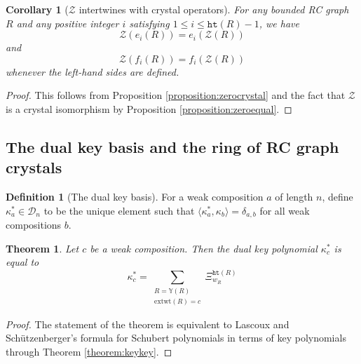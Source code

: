 \documentclass[a4paper,fleqn]{cas-sc}
\newtheorem{corollary}[lemma]{Corollary}
\newtheorem{theorem}{Theorem}[section]
\theoremstyle{definition}
\newtheorem{definition}[lemma]{Definition}
\theoremstyle{remark}
\numberwithin{equation}{subsection}
\newcommand{\wof}[1]{w_{#1}}
\newcommand{\zeromap}{\mathcal{Z}}
\newcommand{\hr}{\mathtt{ht}}
\newcommand{\RC}{\mathcal{RC}}
\newcommand{\lzeromap}{\mathscr{Z}}
\newcommand{\dsch}{\ensuremath{\Xi}}
\newcommand{\dcoma}{\mathcal{D}}
\begin{document}
\begin{corollary}[$\zeromap$ intertwines with crystal operators] \label{corollary:crystaliso}
For any bounded RC graph $R$ and any positive integer $i$ satisfying $1\leq i\leq \hr(R) - 1$, we have 
$$\zeromap(e_i(R)) = e_i(\zeromap(R))$$
and
$$\zeromap(f_i(R)) = f_i(\zeromap(R))$$
whenever the left-hand sides are defined.
\end{corollary}
\begin{proof}
This follows from Proposition \ref{proposition:zerocrystal} and the fact that $\lzeromap$ is a crystal isomorphism by Proposition \ref{proposition:zeroequal}.
\end{proof}

\subsection{The dual key basis and the ring of RC graph crystals}

\begin{definition}[The dual key basis]
  For a weak composition $a$ of length $n$, define $\kappa_a^*\in \dcoma_n$ to be the unique element such that $\langle \kappa_a^*, \kappa_b\rangle = \delta_{a,b}$ for all weak compositions $b$.
\end{definition}






\begin{theorem} \label{theorem:keyformula}
  Let $c$ be a weak composition. Then the dual key polynomial $\kappa^*_c$ is equal to
$$\kappa^*_c = \sum_{\substack{R=\mathbb{Y}(R)\\ \mathrm{extwt}(R)=c}} \dsch_{\wof{R}}^{\hr(R)}$$
\end{theorem}
\begin{proof}
  The statement of the theorem is equivalent to Lascoux and Sch\"utzenberger's formula for Schubert polynomials in terms of key polynomials through Theorem \ref{theorem:keykey}.
\end{proof}
\end{document}
